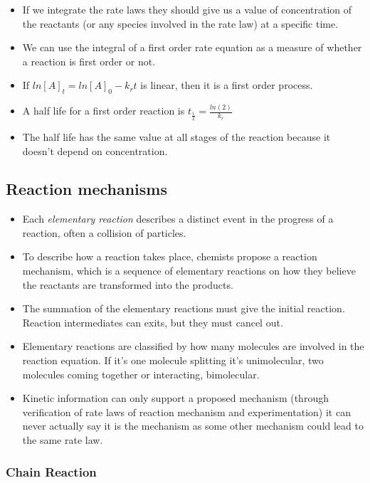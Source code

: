\documentclass[12pt]{article}
\begin{document}
\begin{itemize}
\item
  If we integrate the rate laws they should give us a value of
  concentration of the reactants (or any species involved in the rate
  law) at a specific time.
\item
  We can use the integral of a first order rate equation as a measure of
  whether a reaction is first order or not.
\item
  If \(ln[A]_t = ln[A]_0 - k _rt\) is linear, then it is a first order
  process.
\item
  A half life for a first order reaction is
  \(t_{\frac{1}{2}} = \frac{ln(2)}{k_r}\)
\item
  The half life has the same value at all stages of the reaction because
  it doesn't depend on concentration.
\end{itemize}

\subsection{Reaction mechanisms}\label{reaction-mechanisms}

\begin{itemize}
\item
  Each \emph{elementary reaction} describes a distinct event in the
  progress of a reaction, often a collision of particles.
\item
  To describe how a reaction takes place, chemists propose a reaction
  mechanism, which is a sequence of elementary reactions on how they
  believe the reactants are transformed into the products.
\item
  The summation of the elementary reactions must give the initial
  reaction. Reaction intermediates can exits, but they must cancel out.
\item
  Elementary reactions are classified by how many molecules are involved
  in the reaction equation. If it's one molecule splitting it's
  unimolecular, two molecules coming together or interacting,
  bimolecular.
\item
  Kinetic information can only support a proposed mechanism (through
  verification of rate laws of reaction mechanism and experimentation)
  it can never actually say it is the mechanism as some other mechanism
  could lead to the same rate law.
\end{itemize}

\subsubsection{Chain Reaction}\label{chain-reaction}
\end{document}
